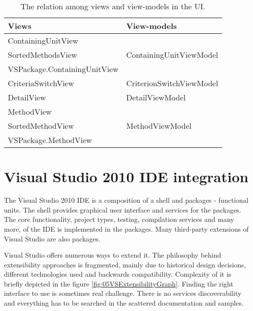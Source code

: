 \begin{table}
\centering
    \begin{tabular}{|l|l|}
        \hline
        \textbf{Views}                                                      & \textbf{View-models }    \\ \hline
        ContainingUnitView 													&       				   \\ 
        SortedMethodsView 													& ContainingUnitViewModel  \\ 
        VSPackage.ContainingUnitView 										&   					   \\ \hline
        CriteriaSwitchView                                                  & CriterionSwitchViewModel \\ \hline
        DetailView                                                          & DetailViewModel          \\ \hline
        MethodView										                    &                          \\
        SortedMethodView								                    & MethodViewModel          \\
        VSPackage.MethodView                                                &                          \\ \hline
    \end{tabular}
    \caption{The relation among views and view-models in the UI.}
   	\label{tab:05viewviewmodels}
    	
\end{table}


\section{Visual Studio 2010 IDE integration}
The Visual Studio 2010 IDE is a composition of a shell and packages - functional units. The shell provides graphical user interface and services for the packages. The core functionality, project types, testing, compilation services and many more, of the IDE is implemented in the packages. Many third-party extensions of Visual Studio are also packages.

Visual Studio offers numerous ways to extend it. The philosophy behind extensibility approaches is fragmented, mainly due to historical design decisions, different technologies used and backwards compatibility. Complexity of it is briefly depicted in the figure \ref{fig:05VSExtensibilityGraph}. Finding the right interface to use is sometimes real challenge. There is no services discoverability and everything has to be searched in the scattered documentation and samples.


